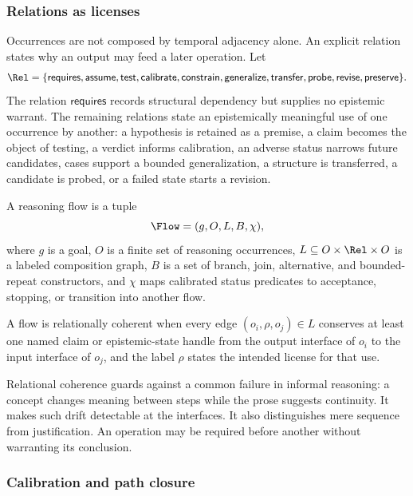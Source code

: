 \subsubsection{Relations as licenses}

Occurrences are not composed by temporal adjacency alone. An explicit relation
states why an output may feed a later operation. Let
\[
  \Rel=\{\mathsf{requires},\mathsf{assume},\mathsf{test},
  \mathsf{calibrate},\mathsf{constrain},\mathsf{generalize},
  \mathsf{transfer},\mathsf{probe},\mathsf{revise},\mathsf{preserve}\}.
\]
The relation $\mathsf{requires}$ records structural dependency but supplies no
epistemic warrant. The remaining relations state an epistemically meaningful
use of one occurrence by another: a hypothesis is retained as a premise, a
claim becomes the object of testing, a verdict informs calibration, an adverse
status narrows future candidates, cases support a bounded generalization, a
structure is transferred, a candidate is probed, or a failed state starts a
revision.

\begin{definition}
A reasoning flow is a tuple
\[
  \Flow=(g,O,L,B,\chi),
\]
where $g$ is a goal, $O$ is a finite set of reasoning occurrences, $L\subseteq
O\times\Rel\times O$ is a labeled composition graph, $B$ is a set of branch,
join, alternative, and bounded-repeat constructors, and $\chi$ maps calibrated
status predicates to acceptance, stopping, or transition into another flow.
\end{definition}

\begin{definition}
A flow is relationally coherent when every edge
$(o_i,\rho,o_j)\in L$ conserves at least one named claim or epistemic-state
handle from the output interface of $o_i$ to the input interface of $o_j$, and
the label $\rho$ states the intended license for that use.
\end{definition}

Relational coherence guards against a common failure in informal reasoning: a
concept changes meaning between steps while the prose suggests continuity. It
makes such drift detectable at the interfaces. It also distinguishes mere
sequence from justification. An operation may be required before another
without warranting its conclusion.

\subsubsection{Calibration and path closure}

